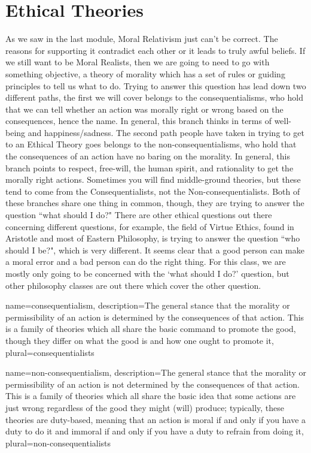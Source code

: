 \section{Ethical Theories}
As we saw in the last module, Moral Relativism just can't be correct. The reasons for supporting it contradict each other or it leads to truly awful beliefs. If we still want to be Moral Realists, then we are going to need to go with something objective, a theory of morality which has a set of rules or guiding principles to tell us what to do.  Trying to answer this question has lead down two different paths, the first we will cover belongs to the \Glspl{consequentialism}, who hold that we can tell whether an action was morally right or wrong based on the consequences, hence the name. In general, this branch thinks in terms of well-being and happiness/sadness. The second path people have taken in trying to get to an Ethical Theory goes belongs to the \Glspl{non-consequentialism}, who hold that the consequences of an action have no baring on the morality. In general, this branch points to respect, free-will, the human spirit, and rationality to get the morally right actions. Sometimes you will find middle-ground theories, but these tend to come from the Consequentialists, not the Non-consequentialists. Both of these branches share one thing in common, though, they are trying to answer the question ``what should I do?" There are other ethical questions out there concerning different questions, for example, the field of Virtue Ethics, found in Aristotle and most of Eastern Philosophy, is trying to answer the question ``who should I be?", which is very different. It seems clear that a good person can make a moral error and a bad person can do the right thing.  For this class, we are mostly only going to be concerned with the `what should I do?' question, but other philosophy classes are out there which cover the other question.

{
  name=consequentialism,
  description={The general stance that the morality or permissibility of an action is determined by the consequences of that action. This is a family of theories which all share the basic command to promote the good, though they differ on what the good is and how one ought to promote it},
  plural=consequentialists
}


{
  name=non-consequentialism,
  description={The general stance that the morality or permissibility of an action is not determined by the consequences of that action. This is a family of theories which all share the basic idea that some actions are just wrong regardless of the good they might (will) produce; typically, these theories are duty-based, meaning that an action is moral if and only if you have a duty to do it and immoral if and only if you have a duty to refrain from doing it},
  plural=non-consequentialists
}

